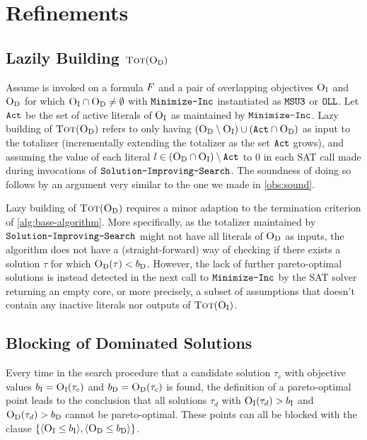 \section{Refinements\label{sec:refinements}}

\subsection{Lazily Building $\textsc{Tot}(\textsc{O}_{\text{D}})$}

Assume \algname{} is invoked on a formula $F$ and a pair of overlapping objectives $\textsc{O}_{\text{I}}$ and $\textsc{O}_{\text{D}}$ for which $\textsc{O}_{\text{I}} \cap \textsc{O}_{\text{D}} \neq \emptyset$ with $\texttt{Minimize-\allowbreak{}Inc}$ instantiated as $\texttt{MSU3}$ or $\texttt{OLL}$. Let $\texttt{Act}$ be the set of active literals of $\textsc{O}_{\text{I}}$ as maintained by $\texttt{Minimize-\allowbreak{}Inc}$.
Lazy building of $\textsc{Tot}(\textsc{O}_{\text{D}})$ refers to only having $(\textsc{O}_{\text{D}} \setminus \textsc{O}_{\text{I}}) \cup  (\texttt{Act} \cap \textsc{O}_{\text{D}})$ as input to the totalizer (incrementally extending the totalizer as the set $\texttt{Act}$ grows), and assuming the value of each literal $l \in (\textsc{O}_{\text{D}} \cap \textsc{O}_{\text{I}}) \setminus \texttt{Act}$ to $0$ in each SAT call made during invocations of $\texttt{Solution-\allowbreak{}Improving-\allowbreak{}Search}$.
The soundness of doing so follows by an argument very similar to the one we made in \cref{obs:sound}.

Lazy building of $\textsc{Tot}(\textsc{O}_{\text{D}})$ requires a minor adaption to the termination criterion of \cref{alg:base-algorithm}.
More specifically, as the totalizer maintained by $\texttt{Solution-\allowbreak{}Improving-\allowbreak{}Search}$ might not have all literals of $\textsc{O}_{\text{D}}$ as inputs, the algorithm does not have a (straight-forward) way of checking if there exists a solution $\tau$ for which $\textsc{O}_{\text{D}}(\tau) < b_{\text{D}}$.
However, the lack of further pareto-optimal solutions is instead detected in the next call to $\texttt{Minimize-\allowbreak{}Inc}$ by the SAT solver returning an empty core, or more precisely, a subset of assumptions that doesn't contain any inactive literals nor outputs of $\textsc{Tot}(\textsc{O}_{\text{I}})$.

\subsection{Blocking of Dominated Solutions}

Every time in the search procedure that a candidate solution $\tau_c$ with objective values $b_{\text{I}} = \textsc{O}_{\text{I}}(\tau_c)$ and $b_{\text{D}} = \textsc{O}_{\text{D}}(\tau_c)$ is found, the definition of a pareto-optimal point leads to the conclusion that all solutions $\tau_d$ with $\textsc{O}_{\text{I}}(\tau_d) > b_{\text{I}}$ and $\textsc{O}_{\text{D}}(\tau_d) > b_{\text{D}}$ cannot be pareto-optimal.
These points can all be blocked with the clause $\{ \langle \textsc{O}_{\text{I}} \leq b_{\text{I}} \rangle, \langle \textsc{O}_{\text{D}} \leq b_{\text{D}} \rangle \}$.


